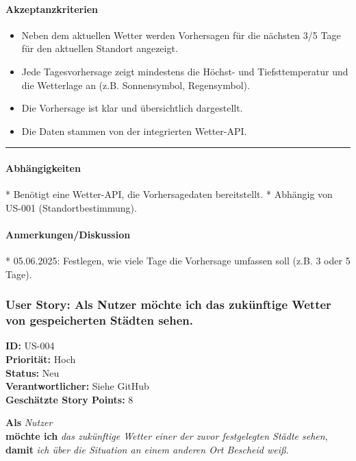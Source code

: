 \documentclass{article}
\begin{document}
\paragraph{Akzeptanzkriterien}
\begin{itemize}
    \item Neben dem aktuellen Wetter werden Vorhersagen für die nächsten 3/5 Tage für den aktuellen Standort angezeigt.
    \item Jede Tagesvorhersage zeigt mindestens die Höchst- und Tiefsttemperatur und die Wetterlage an (z.B. Sonnensymbol, Regensymbol).
    \item Die Vorhersage ist klar und übersichtlich dargestellt.
    \item Die Daten stammen von der integrierten Wetter-API.
\end{itemize}

\vspace{0.5em}
\hrule

\paragraph{Abhängigkeiten}
* Benötigt eine Wetter-API, die Vorhersagedaten bereitstellt.
* Abhängig von US-001 (Standortbestimmung).

\paragraph{Anmerkungen/Diskussion}
* 05.06.2025: Festlegen, wie viele Tage die Vorhersage umfassen soll (z.B. 3 oder 5 Tage).

\clearpage

\subsubsection{User Story: Als Nutzer möchte ich das zukünftige Wetter von gespeicherten Städten sehen.}
\textcolor{storyblue}{\textbf{ID:}} US-004 \\
\textcolor{storyblue}{\textbf{Priorität:}} Hoch \\
\textcolor{storyblue}{\textbf{Status:}} Neu \\
\textcolor{storyblue}{\textbf{Verantwortlicher:}} Siehe GitHub \\
\textcolor{storyblue}{\textbf{Geschätzte Story Points:}} 8

\vspace{0.5em}

\textcolor{storygreen}{\textbf{Als}} \textit{Nutzer} \\
\textcolor{storygreen}{\textbf{möchte ich}} \textit{das zukünftige Wetter einer der zuvor festgelegten Städte sehen}, \\
\textcolor{storygreen}{\textbf{damit}} \textit{ich über die Situation an einem anderen Ort Bescheid weiß}.
\end{document}

